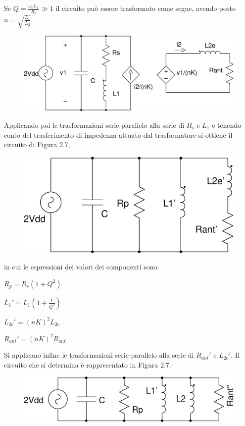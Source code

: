 \documentclass[a4paper, 12pt]{memoir}
\begin{document}
Se $ Q = \frac{\omega_0 L_1}{R_s} \gg 1 $ il circuito può essere trasformato
come segue, avendo posto $n=\sqrt{\frac{L_1}{L_2}}$.
\begin{figure}[h!]
\includegraphics[height=0.2\textheight]{images/cir_model1.pdf}
\centering
\caption{}
\end{figure}

Applicando poi le trasformazioni serie-parallelo\cite[pp. 63-64]{RazaviRF}
alla serie di $R_s$ e $L_1$ e tenendo conto del trasferimento di impedenza
attuato dal trasformatore\cite[pp. 322-323]{GuarnieriET} si ottiene il circuito
di Figura 2.7, 
\begin{figure}[h!]
\includegraphics[height=0.13\textheight]{images/cir_model2.pdf}
\centering
\caption{}
\end{figure}

\noindent in cui le espressioni dei valori dei componenti sono:
\begin{description}
\item $ R_p = R_s \left( 1+Q^2 \right) $
\item $ L_1' = L_1 \left( 1+\frac{1}{Q^2} \right) $
\item $ L_{2e}' = {\left( nK \right)}^2 L_{2e} $
\item $ R_{ant}' = {\left( nK \right)}^2 R_{ant} $
\end{description}

Si applicano infine le trasformazioni serie-parallelo alla serie di  $R_{ant}'$
e $L_{2e}'$. Il circuito che si determina è rappresentato in Figura 2.7. 
\begin{figure}[h!]
\centering
\includegraphics[height=0.1\textheight]{images/cir_model3.pdf}
\caption{}
\end{figure}
\end{document}
